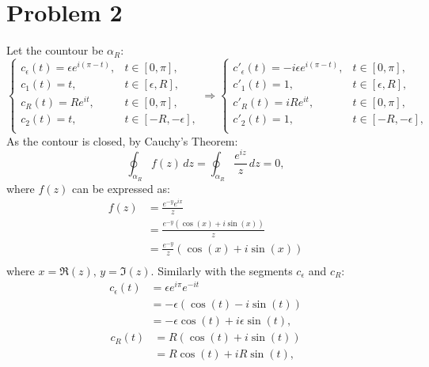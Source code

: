 \documentclass[a4paper, titlepage, DIV=14]{scrartcl}
\begin{document}
    \section*{Problem 2}
    Let the countour be $\alpha_{R}$:
    \[
        \begin{cases}
            c_{\epsilon}(t) = \epsilon e^{i(\pi-t)}, & t\in[0,\pi], \\
            c_{1}(t) = t, & t\in[\epsilon,R], \\
            c_{R}(t) = Re^{it}, & t\in[0, \pi], \\
            c_{2}(t) = t, & t\in[-R, -\epsilon], \\
        \end{cases}    \Rightarrow
        \begin{cases}
            c'_{\epsilon}(t) = -i\epsilon e^{i(\pi-t)}, & t\in[0,\pi], \\
            c'_{1}(t) = 1, & t\in[\epsilon,R], \\
            c'_{R}(t) = iRe^{it}, & t\in[0, \pi], \\
            c'_{2}(t) = 1, & t\in[-R, -\epsilon], \\
        \end{cases}    
    \]
    As the contour is closed, by Cauchy's Theorem:
    \begin{equation}
        \oint_{\alpha_{R}} f(z) \, dz = \oint_{\alpha_{R}} \frac{e^{iz}}{z} \, dz = 0, \label{eq:2}
    \end{equation}
    where $f(z)$ can be expressed as:
    \begin{align*}
        f(z) &= \frac{e^{-y}e^{ix}}{z} \\
            &= \frac{e^{-y}(\cos(x)+i\sin(x))}{z} \\
            &= \frac{e^{-y}}{z}(\cos(x) + i\sin(x)) \\
    \end{align*}
    where $x=\Re(z), \, y=\Im(z)$. Similarly with the segments $c_{\epsilon}$ and $c_{R}$:
    \begin{align*}
        c_{\epsilon}(t) &= \epsilon e^{i\pi}e^{-it} \\
            &= -\epsilon(\cos(t) - i\sin(t)) \\
            &= -\epsilon\cos(t) + i\epsilon\sin(t), 
    \end{align*}
    \begin{align*}
        c_{R}(t) &= R(\cos(t)+i\sin(t)) \\
            &= R\cos(t) + iR\sin(t), 
    \end{align*}
\end{document}

